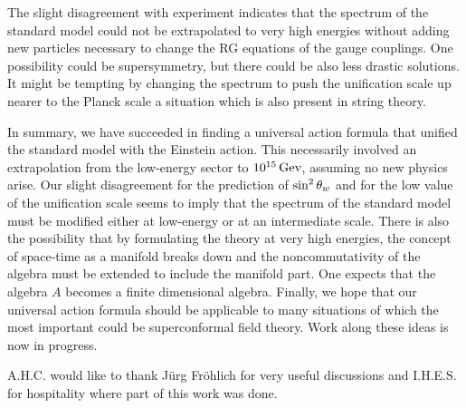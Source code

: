 \medskip

The slight disagreement with experiment
indicates that the spectrum of the standard model could
not be extrapolated to very high energies without adding
new particles necessary to change the RG equations of the
gauge couplings. One possibility could be supersymmetry,
but there could be also less drastic solutions. It might
be tempting by changing the spectrum to push the unification
scale up nearer to the Planck scale a situation
which is also present in string theory.

\medskip

In summary, we have succeeded in finding a universal
action formula that unified the standard model with the
Einstein action. This necessarily involved an
extrapolation from the low-energy sector to $10^{15} \mathop{\rm Gev}\nolimits$,
assuming no new physics arise. Our slight disagreement for the
prediction of $\sin^2 \theta_w$ and for the low value of the
unification scale seems to imply that the spectrum of the
standard model must be modified either at low-energy or at an
intermediate scale. There is also the possibility that by
formulating the theory at very high energies, the concept of
space-time as a manifold breaks down and the
noncommutativity of the algebra must be extended to include
the manifold part. One expects that the algebra $A$ becomes
a finite dimensional algebra. Finally, we hope that our
universal action formula should be applicable to many
situations of which the most important could be
superconformal field theory. Work along these ideas is now in
progress.

\vglue 1cm

 A.H.C. would like to
thank J\"urg Fr\"ohlich for very useful discussions and
I.H.E.S. for hospitality where part of this work was done.

\vfill\eject


\medskip

